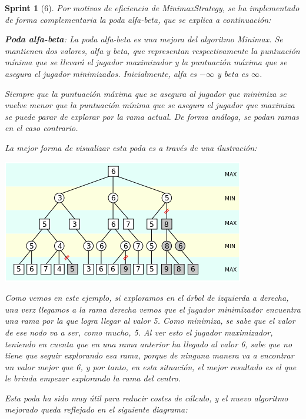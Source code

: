 \documentclass[12pt,a4paper,openright]{book}
\theoremstyle{break}
\newtheorem*{sprint}{Sprint}
\begin{document}
\begin{sprint}[6]
Por motivos de eficiencia de MinimaxStrategy, se ha implementado de forma complementaria la poda alfa-beta, que se explica a continuación:

\textbf{Poda alfa-beta}:
La poda alfa-beta es una mejora del algoritmo Minimax. Se mantienen dos valores, alfa y beta, que representan respectivamente la puntuación mínima que se llevará el jugador maximizador y la puntuación máxima que se asegura el jugador minimizados. Inicialmente, alfa es $-\infty$ y beta es $\infty$. 

Siempre que la puntuación máxima que se asegura al jugador que minimiza se vuelve menor que la puntuación mínima que se asegura el jugador que maximiza se puede parar de explorar por la rama actual. De forma análoga, se podan ramas en el caso contrario.

La mejor forma de visualizar esta poda es a través de una ilustración:

\begin{center}
\centering
\includegraphics[scale=0.5]{poda alfa-beta.png}
\end{center}

Como vemos en este ejemplo, si exploramos en el árbol de izquierda a derecha, una verz llegamos a la rama derecha vemos que el jugador minimizador encuentra una rama por la que logra llegar al valor 5. Como minimiza, se sabe que el valor de ese nodo va a ser, como mucho, 5. Al ver esto el jugador maximizador, teniendo en cuenta que en una rama anterior ha llegado al valor 6, sabe que no tiene que seguir explorando esa rama, porque de ninguna manera va a encontrar un valor mejor que 6, y por tanto, en esta situación, el mejor resultado es el que le brinda empezar explorando la rama del centro.

Esta poda ha sido muy útil para reducir costes de cálculo, y el nuevo algoritmo mejorado queda reflejado en el siguiente diagrama:


\end{sprint}
\end{document}
